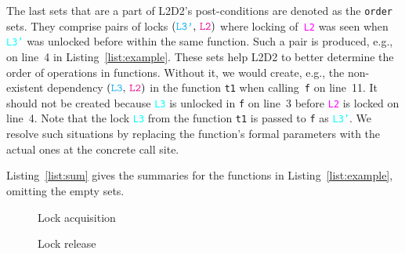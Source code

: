 \documentclass[runningheads]{llncs}
\newcommand{\LLDD}{\textsc{L2D2}\xspace} %
\begin{document}
\enlargethispage{6mm}

The last sets that are a part of \LLDD's post-conditions are denoted as the
\texttt{order} sets. They comprise pairs of locks
$(\text{\texttt{\textcolor{cyan}{L3'}}, \texttt{\textcolor{magenta}{L2}}})$
where locking of~\texttt{\textcolor{magenta}{L2}} was seen when
\texttt{\textcolor{cyan}{L3'}} was unlocked before within the same function.
Such a pair is produced, e.g., on line~4 in Listing~\ref{list:example}. These
sets help \LLDD to better determine the order of operations in functions.
Without it, we would create, e.g., the non-existent dependency
$(\text{\texttt{\textcolor{cyan}{L3}}, \texttt{\textcolor{magenta}{L2}}})$ in
the function \texttt{t1} when calling~\texttt{f} on line~11. It should not be
created because \texttt{\textcolor{cyan}{L3}} is unlocked in \texttt{f} on
line~3 before \texttt{\textcolor{magenta}{L2}} is locked on line~4. Note that
the lock \texttt{\textcolor{cyan}{L3}} from the function \texttt{t1} is passed
to \texttt{f} as \texttt{\textcolor{cyan}{L3'}}. We resolve such situations by
replacing the function's formal parameters with the actual ones at the concrete
call site.

Listing~\ref{list:sum} gives the summaries for the functions in
Listing~\ref{list:example}, omitting the empty sets.

\begin{figure}[t]
\centering
\begin{minipage}{.54 \textwidth}
\centering
\begin{algorithm}[H]
%
%
    \caption{Lock acquisition}
    \label{alg:lock}
\end{algorithm}
\end{minipage}
\hfill
\begin{minipage}{.45 \textwidth}
\centering
\begin{algorithm}[H]
%
%
    \caption{Lock release}
    \label{alg:unlock}
\end{algorithm}
\end{minipage}
\vspace*{-6mm}
\end{figure}
\end{document}
